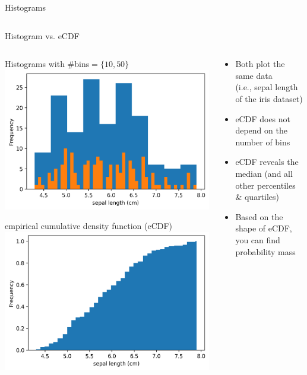 \documentclass[aspectratio=169]{../latex_main/tntbeamer}  %
\begin{document}
\begin{frame}{Histograms}
\begin{columns}
\begin{column}{.6\textwidth}
            \end{column}
        \end{columns}
    \end{frame}
    
    \begin{frame}[c]{Histogram vs. eCDF}
    
        \vspace{-3em}
        \begin{columns}
            \begin{column}{.5\textwidth}
            
                      \centering
                      Histograms with $\#$bins$=\{10,50\}$ \\
                      \includegraphics[width=.6\textwidth]{./figure/hist_iris_sepal_length.png}
                      
                      empirical cumulative density function (eCDF)\\
                      \includegraphics[width=.6\textwidth]{./figure/cdf_iris_sepal_length.png}
            \end{column}
            
            \begin{column}{.5\textwidth}
            
                \begin{itemize}
                    \item Both plot the same data\\ (i.e., sepal length of the iris dataset)
                    \item eCDF does not depend on the number of bins
                    \item eCDF reveals the median (and all other percentiles \& quartiles)
                    \item Based on the shape of eCDF, you can find probability mass
                \end{itemize}


\end{column}
\end{columns}
\end{frame}
\end{document}
